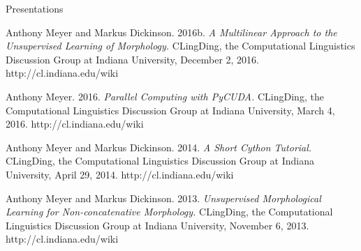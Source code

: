 \begin{singlespace}
\thispagestyle{empty}
\centerline{Presentations}
\begin{description}
\item Anthony Meyer and Markus Dickinson. 2016b. \emph{A Multilinear Approach to the
Unsupervised Learning of Morphology.} CLingDing, the Computational Linguistics
Discussion Group at Indiana University, December 2, 2016.
http://cl.indiana.edu/wiki
\item  Anthony Meyer. 2016. \emph{Parallel Computing with PyCUDA.} CLingDing, the
Computational Linguistics Discussion Group at Indiana University, March 4,
2016. http://cl.indiana.edu/wiki
\item Anthony Meyer and Markus Dickinson. 2014. \emph{A Short Cython Tutorial.} CLingDing,
the Computational Linguistics Discussion Group at Indiana University, April 29,
2014. http://cl.indiana.edu/wiki
\item Anthony Meyer and Markus Dickinson. 2013. \emph{Unsupervised Morphological Learning
for Non-concatenative Morphology.} CLingDing, the Computational Linguistics
Discussion Group at Indiana University, November 6, 2013.
http://cl.indiana.edu/wiki
\end{description}
\vspace{18pt}



\end{singlespace}
